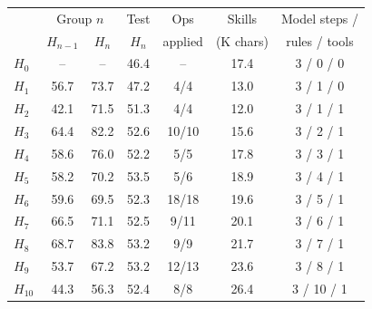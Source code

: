 \begin{tabular}{@{}lcccccc@{}}
\toprule
& \multicolumn{2}{c}{Group $n$} & Test & Ops & Skills & Model steps / \\
& $H_{n-1}$ & $H_n$ & $H_n$ & applied & (K chars) & rules / tools \\
\midrule
$H_0$ & -- & -- & 46.4 & -- & 17.4 & 3 / 0 / 0 \\
$H_{1}$ & 56.7 & 73.7 & 47.2 & 4/4 & 13.0 & 3 / 1 / 0 \\
$H_{2}$ & 42.1 & 71.5 & 51.3 & 4/4 & 12.0 & 3 / 1 / 1 \\
$H_{3}$ & 64.4 & 82.2 & 52.6 & 10/10 & 15.6 & 3 / 2 / 1 \\
$H_{4}$ & 58.6 & 76.0 & 52.2 & 5/5 & 17.8 & 3 / 3 / 1 \\
$H_{5}$ & 58.2 & 70.2 & 53.5 & 5/6 & 18.9 & 3 / 4 / 1 \\
$H_{6}$ & 59.6 & 69.5 & 52.3 & 18/18 & 19.6 & 3 / 5 / 1 \\
$H_{7}$ & 66.5 & 71.1 & 52.5 & 9/11 & 20.1 & 3 / 6 / 1 \\
$H_{8}$ & 68.7 & 83.8 & 53.2 & 9/9 & 21.7 & 3 / 7 / 1 \\
$H_{9}$ & 53.7 & 67.2 & 53.2 & 12/13 & 23.6 & 3 / 8 / 1 \\
$H_{10}$ & 44.3 & 56.3 & 52.4 & 8/8 & 26.4 & 3 / 10 / 1 \\
\bottomrule
\end{tabular}
